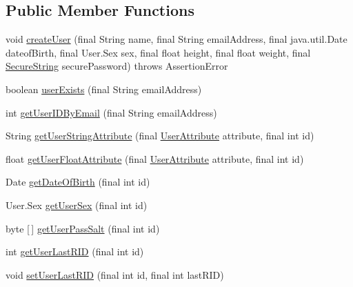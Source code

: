 \subsection*{Public Member Functions}
\begin{DoxyCompactItemize}
\item 
void \mbox{\hyperlink{classcom_1_1activitytracker_1_1_d_b_manager_ac390a33d3547306b250c8a9ed370997c}{create\+User}} (final String name, final String email\+Address, final java.\+util.\+Date dateof\+Birth, final User.\+Sex sex, final float height, final float weight, final \mbox{\hyperlink{classcom_1_1activitytracker_1_1_secure_string}{Secure\+String}} secure\+Password)  throws Assertion\+Error 
\item 
boolean \mbox{\hyperlink{classcom_1_1activitytracker_1_1_d_b_manager_af05d79f33ecf2920a67d1b9cf82c079f}{user\+Exists}} (final String email\+Address)
\item 
int \mbox{\hyperlink{classcom_1_1activitytracker_1_1_d_b_manager_a195dcdeabdd00facb19d720976dd3f53}{get\+User\+I\+D\+By\+Email}} (final String email\+Address)
\item 
String \mbox{\hyperlink{classcom_1_1activitytracker_1_1_d_b_manager_a20f726c054d6c8a6fc3ce629d87f1114}{get\+User\+String\+Attribute}} (final \mbox{\hyperlink{enumcom_1_1activitytracker_1_1_user_attribute}{User\+Attribute}} attribute, final int id)
\item 
float \mbox{\hyperlink{classcom_1_1activitytracker_1_1_d_b_manager_a98df66254bec4d74b29cfe468a9fc794}{get\+User\+Float\+Attribute}} (final \mbox{\hyperlink{enumcom_1_1activitytracker_1_1_user_attribute}{User\+Attribute}} attribute, final int id)
\item 
Date \mbox{\hyperlink{classcom_1_1activitytracker_1_1_d_b_manager_a0576baf67b45c7d2d0ba369052e4404e}{get\+Date\+Of\+Birth}} (final int id)
\item 
User.\+Sex \mbox{\hyperlink{classcom_1_1activitytracker_1_1_d_b_manager_a4e695c111b877cfd1d918602551f65a1}{get\+User\+Sex}} (final int id)
\item 
byte \mbox{[}$\,$\mbox{]} \mbox{\hyperlink{classcom_1_1activitytracker_1_1_d_b_manager_aeab864b072cc08c0521e80ae1f459ca7}{get\+User\+Pass\+Salt}} (final int id)
\item 
int \mbox{\hyperlink{classcom_1_1activitytracker_1_1_d_b_manager_aab14c61b3f3a17bdea10cab1b5fd9337}{get\+User\+Last\+R\+ID}} (final int id)
\item 
void \mbox{\hyperlink{classcom_1_1activitytracker_1_1_d_b_manager_a93b7fc4c2d0083e125852d84f087a8d3}{set\+User\+Last\+R\+ID}} (final int id, final int last\+R\+ID)

\end{DoxyCompactItemize}
